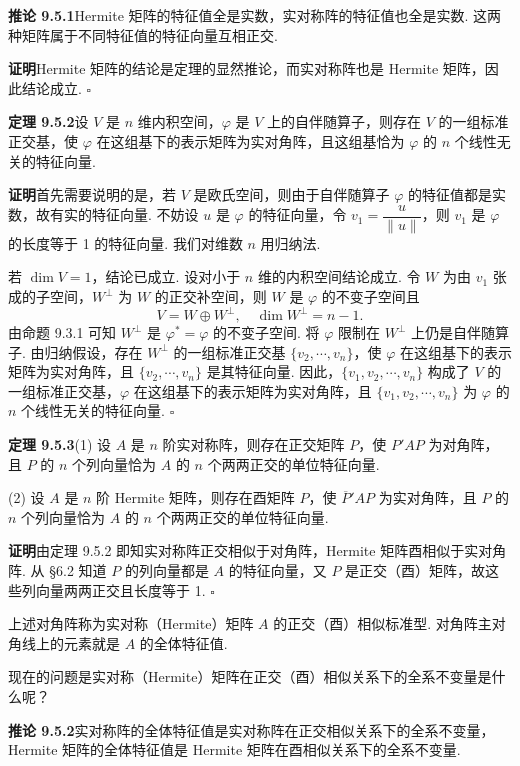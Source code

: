 \documentclass[UTF8, 12pt, fontset=fandol, oneside]{ctexart}
\begin{document}
\noindent\textbf{推论 9.5.1}\quad Hermite 矩阵的特征值全是实数，实对称阵的特征值也全是实数. 这两种矩阵属于不同特征值的特征向量互相正交.

\noindent\textbf{证明}\quad Hermite 矩阵的结论是定理的显然推论，而实对称阵也是 Hermite 矩阵，因此结论成立. $\square$

\noindent\textbf{定理 9.5.2}\quad 设 $V$ 是 $n$ 维内积空间，$\varphi$ 是 $V$ 上的自伴随算子，则存在 $V$ 的一组标准正交基，使 $\varphi$ 在这组基下的表示矩阵为实对角阵，且这组基恰为 $\varphi$ 的 $n$ 个线性无关的特征向量.

\noindent\textbf{证明}\quad 首先需要说明的是，若 $V$ 是欧氏空间，则由于自伴随算子 $\varphi$ 的特征值都是实数，故有实的特征向量. 不妨设 $u$ 是 $\varphi$ 的特征向量，令 $v_1=\dfrac{u}{\|u\|}$，则 $v_1$ 是 $\varphi$ 的长度等于 1 的特征向量. 我们对维数 $n$ 用归纳法.

若 $\dim V=1$，结论已成立. 设对小于 $n$ 维的内积空间结论成立. 令 $W$ 为由 $v_1$ 张成的子空间，$W^\perp$ 为 $W$ 的正交补空间，则 $W$ 是 $\varphi$ 的不变子空间且
\[
  V=W\oplus W^\perp,\quad \dim W^\perp=n-1.
\]
由命题 9.3.1 可知 $W^\perp$ 是 $\varphi^*=\varphi$ 的不变子空间. 将 $\varphi$ 限制在 $W^\perp$ 上仍是自伴随算子. 由归纳假设，存在 $W^\perp$ 的一组标准正交基 $\{v_2,\cdots,v_n\}$，使 $\varphi$ 在这组基下的表示矩阵为实对角阵，且 $\{v_2,\cdots,v_n\}$ 是其特征向量. 因此，$\{v_1,v_2,\cdots,v_n\}$ 构成了 $V$ 的一组标准正交基，$\varphi$ 在这组基下的表示矩阵为实对角阵，且 $\{v_1,v_2,\cdots,v_n\}$ 为 $\varphi$ 的 $n$ 个线性无关的特征向量. $\square$

\noindent\textbf{定理 9.5.3}\quad (1) 设 $A$ 是 $n$ 阶实对称阵，则存在正交矩阵 $P$，使 $P'AP$ 为对角阵，且 $P$ 的 $n$ 个列向量恰为 $A$ 的 $n$ 个两两正交的单位特征向量.

(2) 设 $A$ 是 $n$ 阶 Hermite 矩阵，则存在酉矩阵 $P$，使 $\overline P'AP$ 为实对角阵，且 $P$ 的 $n$ 个列向量恰为 $A$ 的 $n$ 个两两正交的单位特征向量.

\noindent\textbf{证明}\quad 由定理 9.5.2 即知实对称阵正交相似于对角阵，Hermite 矩阵酉相似于实对角阵. 从 §6.2 知道 $P$ 的列向量都是 $A$ 的特征向量，又 $P$ 是正交（酉）矩阵，故这些列向量两两正交且长度等于 1. $\square$

上述对角阵称为实对称（Hermite）矩阵 $A$ 的正交（酉）相似标准型. 对角阵主对角线上的元素就是 $A$ 的全体特征值.

现在的问题是实对称（Hermite）矩阵在正交（酉）相似关系下的全系不变量是什么呢？

\noindent\textbf{推论 9.5.2}\quad 实对称阵的全体特征值是实对称阵在正交相似关系下的全系不变量，Hermite 矩阵的全体特征值是 Hermite 矩阵在酉相似关系下的全系不变量.
\end{document}
